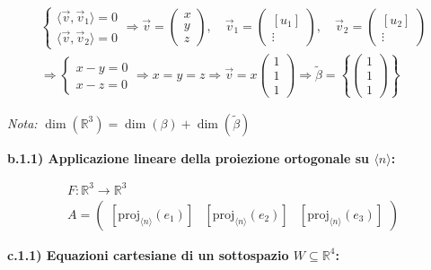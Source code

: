 \documentclass[a4paper,12pt]{article}
\begin{document}
\begin{align*}
\begin{cases}
\langle \vec{v}, \vec{v}_1 \rangle = 0 \\
\langle \vec{v}, \vec{v}_2 \rangle = 0
\end{cases}
\Rightarrow
\vec{v} = \begin{pmatrix}
x \\ y \\ z
\end{pmatrix},\quad 
\vec{v}_1 = \begin{pmatrix}
[u_1] \\ \vdots
\end{pmatrix},\quad 
\vec{v}_2 = \begin{pmatrix}
[u_2] \\ \vdots
\end{pmatrix} \\
\Rightarrow
\begin{cases}
x - y = 0 \\
x - z = 0
\end{cases}
\Rightarrow
x = y = z \Rightarrow 
\vec{v} = x \begin{pmatrix}
1 \\ 1 \\ 1
\end{pmatrix}
\Rightarrow 
\tilde{\beta} = \left\{ \begin{pmatrix}
1 \\ 1 \\ 1
\end{pmatrix} \right\}
\end{align*}

\textit{Nota:} $\dim(\mathbb{R}^3) = \dim(\beta) + \dim(\tilde{\beta})$

\textbf{b.1.1) Applicazione lineare della proiezione ortogonale su $\langle n \rangle$:}

\begin{align*}
F : \mathbb{R}^3 \to \mathbb{R}^3 \\
A = \begin{pmatrix}
\left[ \mathrm{proj}_{\langle n \rangle}(e_1) \right] & 
\left[ \mathrm{proj}_{\langle n \rangle}(e_2) \right] & 
\left[ \mathrm{proj}_{\langle n \rangle}(e_3) \right]
\end{pmatrix}
\end{align*}

\textbf{c.1.1) Equazioni cartesiane di un sottospazio $W \subseteq \mathbb{R}^4$:}
\end{document}
